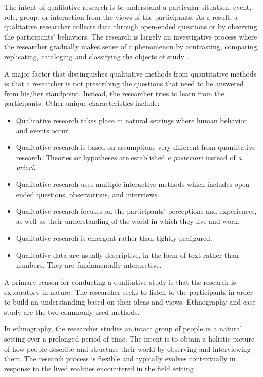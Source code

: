 The intent of qualitative research is to understand a particular situation, event, role, group, or interaction from the views of the participants. As a result, a qualitative researcher collects data through open-ended questions or by observing the participants' behaviors. The research is largely an investigative process where the researcher gradually makes sense of a phenomenon by contrasting, comparing, replicating, cataloging and classifying the objects of study \cite{Miles:1994}.

A major factor that distinguishes qualitative methods from quantitative methods is that a researcher is not prescribing the questions that need to be answered from his/her standpoint. Instead, the researcher tries to learn from the participants. Other unique characteristics include:

\begin{itemize}
	\item Qualitative research takes place in natural settings where human behavior and events occur.
	\item Qualitative research is based on assumptions very different from quantitative research. Theories or hypotheses are established \textit{a posteriori} instead of \textit{a priori}.
	\item Qualitative research uses multiple interactive methods which includes open-ended questions, observations, and interviews.
	\item Qualitative research focuses on the participants' perceptions and experiences, as well as their understanding of the world in which they live and work.
	\item Qualitative research is emergent rather than tightly prefigured. 
	\item Qualitative data are usually descriptive, in the form of text rather than numbers. They are fundamentally interpretive.
\end{itemize}

A primary reason for conducting a qualitative study is that the research is exploratory in nature. The researcher seeks to listen to the participants in order to build an understanding based on their ideas and views. Ethnography and case study are the two commonly used methods.

In ethnography, the researcher studies an intact group of people in a natural setting over a prolonged period of time. The intent is to obtain a holistic picture of how people describe and structure their world by observing and interviewing them. The research process is flexible and typically evolves contextually in response to the lived realities encountered in the field setting \cite{LeCompte:1999}.

